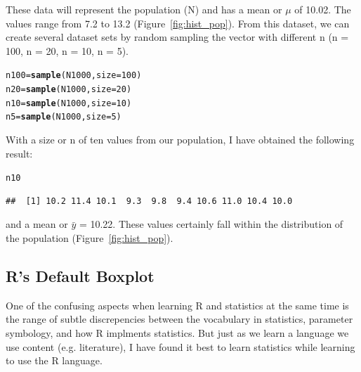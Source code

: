 \documentclass{tufte-handout}\usepackage[]{graphicx}\usepackage[]{color}
\makeatletter
\newcommand{\hlnum}[1]{\textcolor[rgb]{0.686,0.059,0.569}{#1}}%
\newcommand{\hlstd}[1]{\textcolor[rgb]{0.345,0.345,0.345}{#1}}%
\newcommand{\hlkwb}[1]{\textcolor[rgb]{0.69,0.353,0.396}{#1}}%
\newcommand{\hlkwc}[1]{\textcolor[rgb]{0.333,0.667,0.333}{#1}}%
\newcommand{\hlkwd}[1]{\textcolor[rgb]{0.737,0.353,0.396}{\textbf{#1}}}%
\newenvironment{kframe}{%
 \def\at@end@of@kframe{}%
 \ifinner\ifhmode%
  \def\at@end@of@kframe{\end{minipage}}%
  \begin{minipage}{\columnwidth}%
 \fi\fi%
 \def\FrameCommand##1{\hskip\@totalleftmargin \hskip-\fboxsep
 \colorbox{shadecolor}{##1}\hskip-\fboxsep
     \hskip-\linewidth \hskip-\@totalleftmargin \hskip\columnwidth}%
 \MakeFramed {\advance\hsize-\width
   \@totalleftmargin\z@ \linewidth\hsize
   \@setminipage}}%
 {\par\unskip\endMakeFramed%
 \at@end@of@kframe}
\newenvironment{knitrout}{}{} %
\makeatother
\begin{document}
These data will represent the population (N) and has a mean or $\mu$ of 10.02. The values range from 7.2 to 13.2 (Figure~\ref{fig:hist_pop}). From this dataset, we can create several dataset sets by random sampling the vector with different n (n = 100, n = 20, n = 10, n = 5). 

\begin{knitrout}
\color{fgcolor}\begin{kframe}
\begin{alltt}
\hlstd{n100} \hlkwb{=} \hlkwd{sample}\hlstd{(N1000,} \hlkwc{size} \hlstd{=} \hlnum{100}\hlstd{)}
\hlstd{n20} \hlkwb{=} \hlkwd{sample}\hlstd{(N1000,} \hlkwc{size} \hlstd{=} \hlnum{20}\hlstd{)}
\hlstd{n10} \hlkwb{=} \hlkwd{sample}\hlstd{(N1000,} \hlkwc{size} \hlstd{=} \hlnum{10}\hlstd{)}
\hlstd{n5} \hlkwb{=} \hlkwd{sample}\hlstd{(N1000,} \hlkwc{size} \hlstd{=} \hlnum{5}\hlstd{)}
\end{alltt}
\end{kframe}
\end{knitrout}

With a size or n of ten values from our population, I have obtained the following result: 
\begin{knitrout}
\color{fgcolor}\begin{kframe}
\begin{alltt}
\hlstd{n10}
\end{alltt}
\begin{verbatim}
##  [1] 10.2 11.4 10.1  9.3  9.8  9.4 10.6 11.0 10.4 10.0
\end{verbatim}
\end{kframe}
\end{knitrout}
\noindent and a mean or $\bar{y}$ = 10.22. These values certainly fall within the distribution of the population (Figure~\ref{fig:hist_pop}).

\subsection{R's Default Boxplot}

One of the confusing aspects when learning R and statistics at the same time is the range of subtle discrepencies between the vocabulary in statistics, parameter symbology, and how R implments statistics. But just as we learn a language we use content (e.g. literature), I have found it best to learn statistics while learning to use the R language. 
\end{document}
